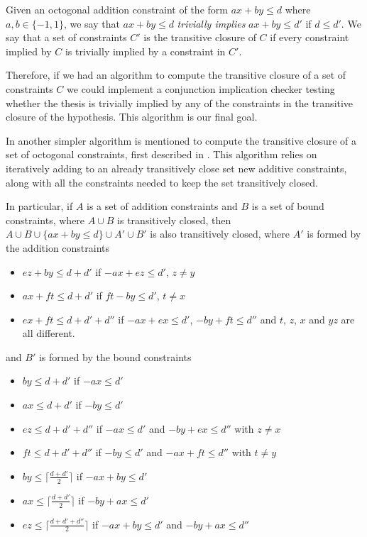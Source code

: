 Given an octogonal addition constraint of the form $ax + by\le d$ where $a,b\in
\{-1,1\}$, we say that $ax + by \le d$ \emph{trivially implies} $ax + by \le d'$
if $d \le d'$. We say that a set of constraints $C'$ is the transitive closure of
$C$ if every constraint implied by $C$ is trivially implied by a constraint in 
$C'$.

Therefore, if we had an algorithm to compute the transitive closure of a set of
constraints $C$ we could implement a conjunction implication checker testing
whether the thesis is trivially implied by any of the constraints in the 
transitive closure of the hypothesis. This algorithm is our final goal.

In \cite{TransitiveClosure} another simpler algorithm is mentioned to compute the
transitive closure of a set of octogonal constraints, first described in 
\cite{HarveyStuckey}. This algorithm relies on iteratively adding to an already 
transitively close set new additive constraints, along with all the constraints needed
to keep the set transitively closed.

In particular, if $A$ is a set of addition constraints and $B$ is a set of bound 
constraints, where $A \cup B$ is transitively closed, then 
${A \cup B \cup \{ax+by \le d\} \cup A' \cup B'}$ is also transitively closed, where
$A'$ is formed by the addition constraints
\begin{itemize}
    \item $ez + by \le d + d'$ if $-ax + ez \le d'$, $z \ne y$
    \item $ax + ft \le d + d'$ if $ft - by \le d'$, $t \ne x$
    \item $ex + ft \le d + d' + d''$ if $-ax + ex \le d'$, $-by + ft \le d''$ and $t$, $z$, $x$ and $yz$ are all different.
\end{itemize}

\noindent and $B'$ is formed by the bound constraints

\begin{itemize}
    \item $by \le d + d'$ if $-ax \le d'$
    \item $ax \le d + d'$ if $-by \le d'$
    \item $ez \le d + d' + d''$ if $-ax \le d'$ and $-by + ex \le d''$ with $z \ne x$
    \item $ft \le d + d' + d''$ if $-by \le d'$ and $-ax + ft \le d''$ with $t \ne y$
    \item $by \le \lceil \frac{d + d'}{2}\rceil$ if $-ax + by \le d'$
    \item $ax \le \lceil \frac{d + d'}{2}\rceil$ if $-by + ax \le d'$
    \item $ez \le \lceil \frac{d + d' + d''}{2}\rceil$ if $-ax + by \le d'$ and $-by + ax \le d''$
\end{itemize}

